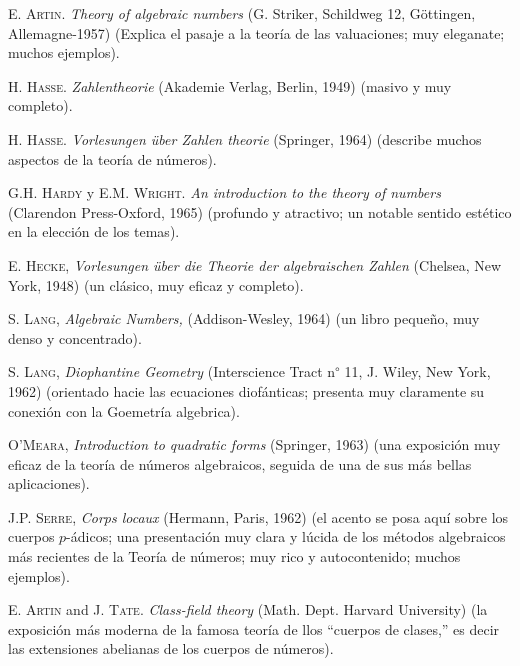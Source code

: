 \documentclass[oneside,bibtotoc,leqno,spanish]{amsbook}
\numberwithin{equation}{section}
\theoremstyle{defi}
\theoremstyle{note}
\theoremstyle{rem}
\numberwithin{theorem}{section}
\numberwithin{proposition}{section}
\numberwithin{definition}{section}
\numberwithin{lemma}{section}
\numberwithin{corollary}{section}
\numberwithin{example}{section}
\numberwithin{footnote}{section}%
\begin{document}
\backmatter

\begin{thebibliography}{21}

\bibitem{} {\scshape E. Artin.} {\itshape Theory of algebraic numbers}
(G. Striker, Schildweg 12, G\"ottingen, Allemagne-1957)
(Explica el pasaje a la teor\'ia de las valuaciones; muy
eleganate; muchos ejemplos).

\bibitem{} {\scshape H. Hasse.} {\itshape Zahlentheorie}
(Akademie Verlag, Berlin, 1949) (masivo y muy completo).

\bibitem{} {\scshape H. Hasse.} {\itshape Vorlesungen \"uber
Zahlen theorie} (Springer, 1964) (describe muchos aspectos
de la teor\'ia de n\'umeros).

\bibitem{} {\scshape G.H. Hardy} y {\scshape E.M. Wright.} {\itshape An introduction to the theory
of numbers} (Clarendon Press-Oxford, 1965) (profundo y atractivo; un notable sentido est\'etico en
la elecci\'on de los temas).

\bibitem{} {\scshape E. Hecke,} {\itshape Vorlesungen \"uber die Theorie der algebraischen Zahlen}
(Chelsea, New York, 1948) (un cl\'asico, muy eficaz y completo).

\bibitem{} {\scshape S. Lang,} {\itshape Algebraic Numbers,} (Addison-Wesley, 1964) (un
libro peque\~no, muy denso y concentrado).

\bibitem{} {\scshape S. Lang,} {\itshape Diophantine Geometry} (Interscience Tract n\textsuperscript{$\circ$}
11, J. Wiley, New York, 1962) (orientado hacie las ecuaciones diof\'anticas; presenta muy claramente su
conexi\'on con la Goemetr\'ia algebrica).

\bibitem{} {\scshape O'Meara,} {\itshape Introduction to quadratic forms} (Springer, 1963) (una exposici\'on
muy eficaz de la teor\'ia de n\'umeros algebraicos, seguida de una de sus m\'as bellas aplicaciones).

\bibitem{} {\scshape J.P. Serre,} {\itshape Corps locaux} (Hermann, Paris, 1962) (el acento se posa aqu\'i
sobre los cuerpos $p$-\'adicos; una presentaci\'on muy clara y l\'ucida de los m\'etodos algebraicos m\'as
recientes de la Teor\'ia de n\'umeros; muy rico y autocontenido; muchos ejemplos).

\bibitem{} {\scshape E. Artin} and {\scshape J. Tate.} {\itshape Class-field theory}
(Math. Dept. Harvard University) (la exposici\'on m\'as moderna de la famosa teor\'ia de llos ``cuerpos de clases,''
es decir las extensiones abelianas de los cuerpos de n\'umeros).


\end{thebibliography}
\end{document}
